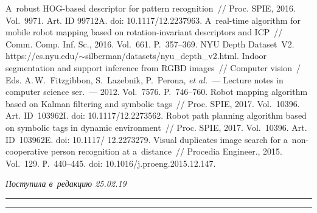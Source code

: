 \begin{multicols}{2}
{{\begin{thebibliography}{99}
 A~robust HOG-based descriptor for pattern 
recognition~// Proc. SPIE, 2016. Vol.~9971.
 Art. ID 99712A. doi: 10.1117/12.2237963.
 A~real-time algorithm for mobile robot 
mapping based on rotation-invariant descriptors and ICP~// Comm. 
Comp. Inf. Sc., 2016. Vol.~661. P.~357--369.
 NYU Depth Dataset~V2. {\sf 
https://cs.nyu.edu/$\sim$silberman/datasets/\linebreak  nyu\_depth\_v2.html}.
 Indoor segmentation and 
support inference from RGBD images~// Computer 
vision~/ Eds. A.\,W.~Fitzgibbon, S.~Lazebnik, P.~Perona,
\textit{et al.}~--- Lecture notes in computer science ser.~--- 2012. Vol.~7576.  
P.~746--760.
Robot mapping algorithm based on Kalman filtering and symbolic tags~// Proc. 
SPIE, 2017. Vol.~10396. Art. 
ID~103962I. doi: 10.1117/12.2273562.
Robot path planning algorithm based on symbolic tags in dynamic environment~// 
Proc. SPIE, 2017. Vol.~10396. Art. 
ID~103962E. doi: 10.1117/ 12.2273279.
 Visual duplicates image search for  
a~non-cooperative person recognition at a~distance~// Procedia Engineer., 
2015. Vol.~129. Р.~440--445. doi: 10.1016/j.proeng.2015.12.147.
 \end{thebibliography}

 }
 }

\end{multicols}

\vspace*{-3pt}

\hfill{\small\textit{Поступила в~редакцию 25.02.19}}

\vspace*{8pt}




\hrule

\vspace*{2pt}

\hrule


